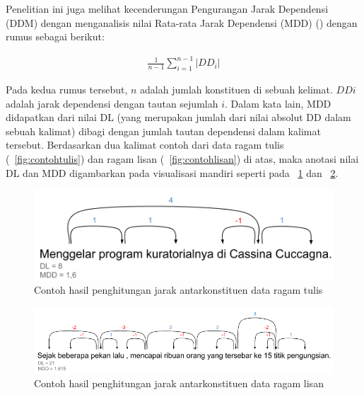 Penelitian ini juga melihat kecenderungan Pengurangan Jarak Dependensi (DDM) dengan menganalisis nilai Rata-rata Jarak Dependensi (MDD) (\citealp{liu2008dependency, liu2017dependency}) dengan rumus sebagai berikut:

\noindent \begin{align}\label{eq:bola}
	\frac{1}{n-1} \displaystyle\sum_{i=1}^{n-1} |DD_i|
\end{align}

Pada kedua rumus tersebut, $n$ adalah jumlah konstituen di sebuah kelimat. $DDi$ adalah jarak dependensi dengan tautan sejumlah $i$. Dalam kata lain, MDD didapatkan dari nilai DL (yang merupakan jumlah dari nilai absolut DD dalam sebuah kalimat) dibagi dengan jumlah tautan dependensi dalam kalimat tersebut. Berdasarkan dua kalimat contoh dari data ragam tulis (\pic~\ref{fig:contohtulis}) dan ragam lisan (\pic~\ref{fig:contohlisan}) di atas, maka anotasi nilai DL dan MDD digambarkan pada visualisasi mandiri seperti pada \pic~\ref{fig:contohtulis_DLMDD} dan \pic~\ref{fig:contohlisan_DLMDD}.

\begin{figure}
	\centering \includegraphics[width=0.5
	\textwidth] {pics/contohtulis_DLMDD.png} \caption{Contoh hasil penghitungan jarak antarkonstituen data ragam tulis} 
\label{fig:contohtulis_DLMDD} 
\end{figure}

\begin{figure}
	\centering \includegraphics[width=0.85
	\textwidth] {pics/contohlisan_DLMDD.png} \caption{Contoh hasil penghitungan jarak antarkonstituen data ragam lisan} 
\label{fig:contohlisan_DLMDD} 
\end{figure}

